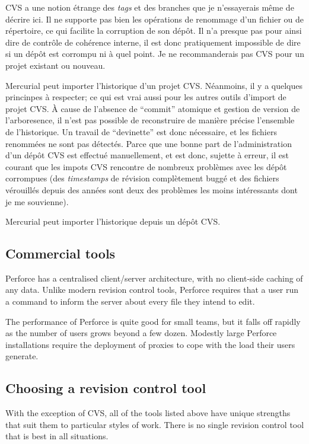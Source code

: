 CVS a une notion étrange des \textit{tags} et des branches que je n'essayerais
même de décrire ici. Il ne supporte pas bien les opérations de renommage d'un 
fichier ou de répertoire, ce qui facilite la corruption de son dépôt. Il n'a
presque pas pour ainsi dire de contrôle de cohérence interne, il est donc 
pratiquement impossible de dire si un dépôt est corrompu ni à quel point. Je
ne recommanderais pas CVS pour un projet existant ou nouveau.

Mercurial peut importer l'historique d'un projet CVS. Néanmoins, il y a 
quelques princinpes à respecter; ce qui est vrai aussi pour les autres
outils d'import de projet CVS. À cause de l'absence de ``commit'' atomique
et gestion de version de l'arboresence, il n'est pas possible de reconstruire
de manière précise l'ensemble de l'historique. Un travail de ``devinette''
est donc nécessaire, et les fichiers renommées ne sont pas détectés. Parce 
que une bonne part de l'administration d'un dépôt CVS est effectué manuellement, 
et est donc, sujette à erreur, il est courant que les impots CVS rencontre 
de nombreux problèmes avec les dépôt corrompues (des \textit{timestamps} 
de révision complètement buggé et des fichiers vérouillés depuis des années 
sont deux des problèmes les moins intéressants dont je me souvienne).

Mercurial peut importer l'historique depuis un dépôt CVS.

\subsection{Commercial tools}

Perforce has a centralised client/server architecture, with no
client-side caching of any data.  Unlike modern revision control
tools, Perforce requires that a user run a command to inform the
server about every file they intend to edit.

The performance of Perforce is quite good for small teams, but it
falls off rapidly as the number of users grows beyond a few dozen.
Modestly large Perforce installations require the deployment of
proxies to cope with the load their users generate.


\subsection{Choosing a revision control tool}

With the exception of CVS, all of the tools listed above have unique
strengths that suit them to particular styles of work.  There is no
single revision control tool that is best in all situations.


